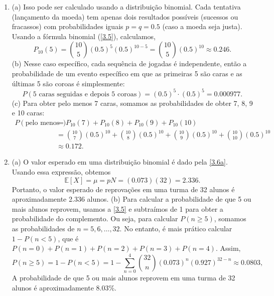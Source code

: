 \begin{enumerate}[label=\textbf{3.\arabic*.}]
	\item (a) Isso pode ser calculado usando a distribuição binomial. Cada tentativa (lançamento da moeda) tem apenas dois resultados possíveis (sucessos ou fracassos) com probabilidades iguais $p = q = 0.5$ (caso a moeda seja justa). Usando a fórmula binomial (\autoref{3.5}), calculamos,
	\begin{equation*}
	P_{10}(5) = \binom{10}{5} (0.5)^5 (0.5)^{10 - 5} = \binom{10}{5}(0.5)^{10} \approx 0.246. 
	\end{equation*}
	(b) Nesse caso específico, cada sequência de jogadas é independente, então a probabilidade de um evento específico em que as primeiras 5 são caras e as últimas 5 são coroas é simplesmente:
	\begin{equation*}
	P(\text{5 caras seguidas e depois 5 coroas}) = (0.5)^5 \cdot (0.5)^5 = 0.000977.
	\end{equation*}
	(c) Para obter pelo menos 7 caras, somamos as probabilidades de obter 7, 8, 9 e 10 caras:
	\begin{align*}
	P(\text{pelo menos 7 caras}) &= P_{10}(7) + P_{10}(8) + P_{10}(9) + P_{10}(10) \\
	& = \binom{10}{7} (0.5)^{10} + \binom{10}{8} (0.5)^{10} + \binom{10}{9} (0.5)^{10} + \binom{10}{10} (0.5)^{10} \\
	&\approx 0.172.
	\end{align*}
	
	\item (a) O valor esperado em uma distribuição binomial é dado pela \autoref{3.6a}. Usando essa expressão, obtemos
	\begin{equation*}
	\mathbb{E}[X] = \mu = pN = (0.073)(32) = 2.336.
	\end{equation*}
	Portanto, o valor esperado de reprovações em uma turma de 32 alunos é aproximadamente 2.336 alunos. (b)	Para calcular a probabilidade de que 5 ou mais alunos reprovem, usamos a \autoref{3.5} e subtraímos de 1 para obter a probabilidade do complemento. Ou seja, para calcular $P(n \geq 5)$, somamos as probabilidades de $n = 5, 6, \dots, 32$. No entanto, é mais prático calcular $1 - P(n < 5)$, que é $P(n = 0) + P(n = 1) + P(n = 2) + P(n = 3) + P(n = 4)$. Assim, 
	\begin{equation*}
	P(n \geq 5) = 1 - P(n < 5) = 1 - \sum_{n=0}^{4} \binom{32}{n} (0.073)^n (0.927)^{32-n} \approx 0.0803,
	\end{equation*}	
	A probabilidade de que 5 ou mais alunos reprovem em uma turma de 32 alunos é aproximadamente 8.03\%.
	

\end{enumerate}
